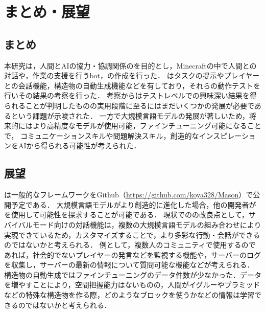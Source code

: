 \chapter{まとめ・展望}	
\thispagestyle{plain}   %

\section{まとめ}
本研究は，人間とAIの協力・協調関係のを目的とし，Minecraftの中で人間との対話や，作業の支援を行うbot，{\mason}の作成を行った．
{\mason}はタスクの提示やプレイヤーとの会話機能，構造物の自動生成機能などを有しており，それらの動作テストを行いその結果の考察を行った．
考察からはテストレベルでの興味深い結果を得られることが判明したものの実用段階に至るにはまだいくつかの発展が必要であるという課題が示唆された．
一方で大規模言語モデルの発展が著しいため，将来的にはより高精度なモデルが使用可能，ファインチューニング可能になることで，
コミュニケーションスキルや問題解決スキル，創造的なインスピレーションをAIから得られる可能性が考えられた．

\section{展望}
{\mason}は一般的なフレームワークをGithub（\url{https://github.com/koya328/Mason}）で公開予定である．
大規模言語モデルがより創造的に進化した場合，他の開発者が{\mason}を使用して可能性を探求することが可能である．
現状での{\mason}の改良点として，サバイバルモード向けの対話機能は，複数の大規模言語モデルの組み合わせにより実現できているため，カスタマイズすることで，より多彩な行動・会話ができるのではないかと考えられる．
例として，複数人のコミュニティで使用するのであれば，社会的でないプレイヤーの発言などを監視する機能や，サーバーのログを収集し，サーバーの最新の情報について質問可能な機能などが考えられる．
構造物の自動生成ではファインチューニングのデータ件数が少なかった．データを増やすことにより，空間把握能力はないものの，人間がイグルーやプラミッドなどの特殊な構造物を作る際，どのようなブロックを使うかなどの情報は学習できるのではないかと考えられる．